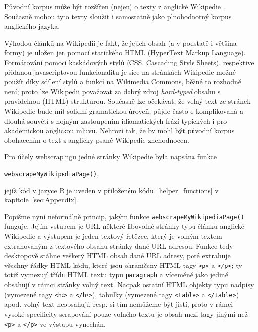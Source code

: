 Původní korpus může být rozšířen (nejen) o texty z anglické Wikipedie%
.
Současně mohou tyto texty sloužit i samostatně jako plnohodnotný korpus
anglického jazyka.

Výhodou článků na Wikipedii je fakt, že jejich obsah (a
v podstatě i většina
formy) je uložen jen pomocí statického HTML
(\underline{H}yper\underline{T}ext \underline{M}arkup \underline{L}anguage).
Formátování pomocí kaskádových stylů (CSS, \underline{C}ascading
\underline{S}tyle \underline{S}heets), respektive přidanou
javascriptovou funkcionalitu je sice na stránkách Wikipedie%
 možné použít
díky sdílení stylů a funkcí na Wikimedia Commons, běžné to rozhodně není;
proto lze Wikipedii považovat za dobrý zdroj
\textit{hard-typed} obsahu s pravidelnou (HTML) strukturou.
Současně lze očekávat, že volný text ze stránek Wikipedie%
 bude mít solidní
gramatickou úroveň, půjde často o komplikovaná a dlouhá souvětí s hojným
zastoupením idiomatických frází typických i pro akademickou anglickou mluvu.
Nehrozí tak, že by mohl být původní korpus obohacením o text z anglicky
psané Wikipedie znehodnocen.

Pro účely webscrapingu jedné stránky Wikipedie%
 byla napsána funkce

\begin{center}
\texttt{webscrapeMyWikipediaPage()},
\end{center}

\noindent jejíž kód v jazyce \textsf{R} je uveden v přiloženém
kódu~\ref{helper_functions} v kapitole~\ref{sec:Appendix}.

Popišme nyní neformálně princip, jakým funkce
\texttt{webscrapeMyWikipediaPage()} funguje. Jejím vstupem je URL některé libovolné
stránky typu článku anglické Wikipedie a výstupem je jeden textový řetězec,
který je volným textem extrahovaným z textového obsahu stránky dané URL
adresou. Funkce tedy desktopově stáhne veškerý HTML obsah dané URL adresy,
poté extrahuje všechny řádky HTML kódu, které jsou ohraničeny HTML tagy
\texttt{<p>} a \texttt{</p>}; ty totiž vymezují třídu HTML textu typu
\texttt{paragraph} a víceméně jako jediné obsahují v rámci stránky
volný text. Naopak ostatní HTML objekty typu nadpisy (vymezené tagy
\texttt{<h$i$>} a \texttt{</h$i$>}), tabulky (vymezené tagy \texttt{<table>}
a \texttt{</table>}) apod. volný text neobsahují, resp. si tím nemůžeme
být jistí, proto v rámci vysoké specificity scrapování pouze volného
textu je obsah mezi tagy jinými než \texttt{<p>} a \texttt{</p>} ve výstupu
vynechán.

